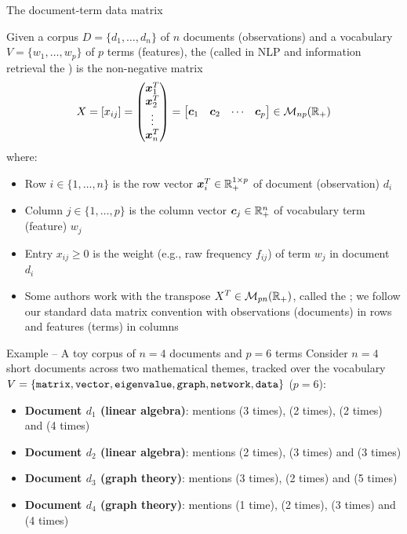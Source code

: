 \documentclass[aspectratio=169]{beamer}\usepackage[]{graphicx}\usepackage[]{xcolor}
\begin{document}
\begin{frame}{The document-term data matrix}
\begin{importantdefinition}
Given a corpus $D = \{d_1, \ldots, d_n\}$ of $n$ documents (observations) and a vocabulary $V = \{w_1, \ldots, w_p\}$ of $p$ terms (features), the  (called in NLP and information retrieval the ) is the non-negative matrix
\[
X = [x_{ij}] = \begin{pmatrix} \bm{x}_1^T \\ \bm{x}_2^T \\ \vdots \\ \bm{x}_n^T \end{pmatrix} = \begin{bmatrix} \bm{c}_1 & \bm{c}_2 & \cdots & \bm{c}_p \end{bmatrix} \in \mathcal{M}_{np}(\mathbb{R}_+)
\]
where:
\begin{itemize}
\item Row $i \in \{1, \ldots, n\}$ is the row vector $\bm{x}_i^T \in \mathbb{R}_+^{1 \times p}$ of document (observation) $d_i$
\item Column $j \in \{1, \ldots, p\}$ is the column vector $\bm{c}_j \in \mathbb{R}_+^n$ of vocabulary term (feature) $w_j$
\item Entry $x_{ij} \ge 0$ is the weight (e.g., raw frequency $f_{ij}$) of term $w_j$ in document $d_i$
\end{itemize}
\end{importantdefinition}
\vfill
\begin{itemize}
\item Some authors work with the transpose $X^T \in \mathcal{M}_{pn}(\mathbb{R}_+)$, called the ; we follow our standard data matrix convention with observations (documents) in rows and features (terms) in columns
\end{itemize}
\end{frame}


\begin{frame}{Example -- A toy corpus of $n=4$ documents and $p=6$ terms}
Consider $n=4$ short documents across two mathematical themes, tracked over the vocabulary $V = \{{\tt matrix}, {\tt vector}, {\tt eigenvalue}, {\tt graph}, {\tt network}, {\tt data}\}$ ($p=6$):
\vfill
\begin{itemize}
\item \textbf{Document $d_1$ (linear algebra)}: mentions  (3 times),  (2 times),  (2 times) and  (4 times)
\vfill
\item \textbf{Document $d_2$ (linear algebra)}: mentions  (2 times),  (3 times) and  (3 times)
\vfill
\item \textbf{Document $d_3$ (graph theory)}: mentions  (3 times),  (2 times) and  (5 times)
\vfill
\item \textbf{Document $d_4$ (graph theory)}: mentions  (1 time),  (2 times),  (3 times) and  (4 times)
\end{itemize}
\end{frame}
\end{document}
